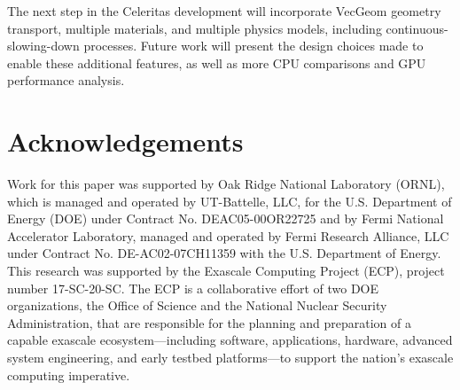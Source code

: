 \documentclass{webofc}
\begin{document}
The next step in the Celeritas development will incorporate VecGeom geometry
transport, multiple materials, and multiple physics models, including
continuous-slowing-down processes. Future work will present the design choices
made to enable these additional features, as well as more CPU comparisons and
GPU performance analysis.

\section{Acknowledgements}

Work for this paper was supported by Oak Ridge National Laboratory (ORNL), which is managed and operated by UT-Battelle, LLC, for the U.S. Department of Energy (DOE) under Contract No. DEAC05-00OR22725 and by Fermi National Accelerator Laboratory, managed and operated by Fermi Research Alliance, LLC under Contract No. DE-AC02-07CH11359 with the U.S. Department of Energy.
This research was supported by the Exascale Computing
Project (ECP), project number 17-SC-20-SC. The ECP is a collaborative effort of
two DOE organizations, the Office of Science and the National Nuclear Security
Administration, that are responsible for the planning and preparation of a
capable exascale ecosystem---including software, applications, hardware,
advanced system engineering, and early testbed platforms---to support the
nation's exascale computing imperative.


\end{document}

